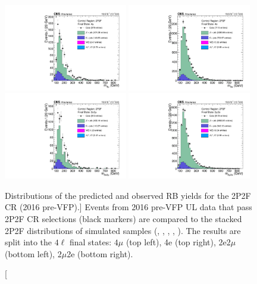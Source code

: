 \begin{figure}[!htbp]
	\begin{center}
		\includegraphics[width=0.48\textwidth]{figures/higgsmassmeas/redbkg/cr/UL2016preVFP_CR_2P2F_4mu.pdf}
		\includegraphics[width=0.48\textwidth]{figures/higgsmassmeas/redbkg/cr/UL2016preVFP_CR_2P2F_4e.pdf}
		\includegraphics[width=0.48\textwidth]{figures/higgsmassmeas/redbkg/cr/UL2016preVFP_CR_2P2F_2e2mu.pdf}
		\includegraphics[width=0.48\textwidth]{figures/higgsmassmeas/redbkg/cr/UL2016preVFP_CR_2P2F_2mu2e.pdf}
		\caption
			[Distributions of the predicted and observed RB yields for the 2P2F CR (2016 pre-VFP).]
			{
			Events from 2016 pre-VFP UL data that pass 2P2F CR selections (black markers) 
			are compared to the stacked 2P2F distributions of simulated samples
			(\Zplusjets, \ttbarplusjets, \WZ, \ZZ, \Zgammastar).
			The results are split into the $4\ell$ final states:
            $4\mu$ (top left), 4e (top right), 2e2$\mu$ (bottom left), 2$\mu$2e (bottom right).
			}
		\label{cr_plots_2p2f_2016prevfp}
	\end{center}
\end{figure}
